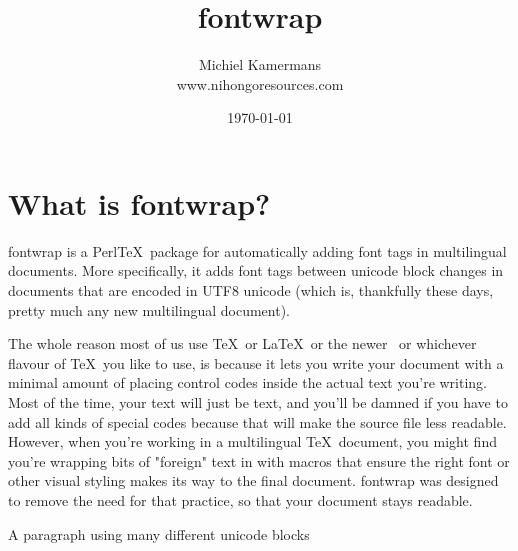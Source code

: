 \documentclass[12pt]{article}
\begin{document}
  \title{fontwrap}
  \author{Michiel Kamermans\\www.nihongoresources.com}
  \date{\today}
  \maketitle


  



  \section{What is fontwrap?}

  fontwrap is a Perl\TeX\ package for automatically adding font tags in multilingual
  documents. More specifically, it adds font tags between unicode block changes
  in documents that are encoded in UTF8 unicode (which is, thankfully these days,
  pretty much any new multilingual document).
  
  The whole reason most of us use \TeX\ or \LaTeX\ or the newer \LaTeXe\ or
  whichever flavour of \TeX\ you like to use, is because it lets you write your
  document with a minimal amount of placing control codes inside the actual text
  you're writing. Most of the time, your text will just be text, and you'll be
  damned if you have to add all kinds of special codes because that will make the
  source file less readable. However, when you're working in a multilingual \TeX\ document,
  you might find you're wrapping bits of "foreign" text in with macros that ensure
  the right font or other visual styling makes its way to the final document.
  fontwrap was designed to remove the need for that practice, so that your document
  stays readable.

  \begin{block}
  \caption{A paragraph using many different unicode blocks}
  \end{block}
\end{document}
